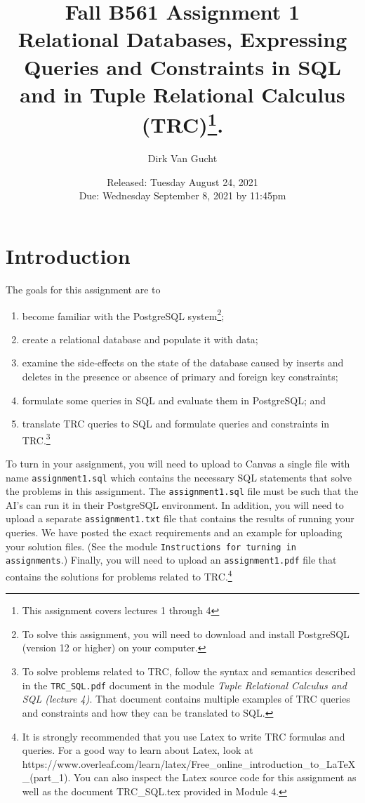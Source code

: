 \documentclass{article}
\begin{document}
\title{Fall B561 Assignment 1 \\
Relational Databases, Expressing Queries and Constraints in SQL and in Tuple Relational Calculus (TRC)\footnote{This assignment covers lectures 1 through 4}.}
\author{Dirk Van Gucht}
\date{Released: Tuesday August 24, 2021\\ Due: Wednesday September 8, 2021 by 11:45pm}
\maketitle


\section{Introduction}

The goals for this assignment are to 
\begin{enumerate}
\item become familiar with the PostgreSQL system\footnote{To solve this assignment, you will need to download and install PostgreSQL (version 12 or higher) on your computer.};
\item create a relational database and populate it with data;
\item examine the side-effects on the state of the database caused by inserts and deletes in the presence or absence
of primary and foreign key constraints;
\item formulate some queries in SQL and evaluate them in PostgreSQL; and
\item translate TRC queries to SQL and 
formulate queries and constraints in TRC.\footnote{To solve problems related to TRC, follow the syntax and semantics described in the {\tt TRC\_SQL.pdf} document
in the module \emph{Tuple Relational Calculus and SQL (lecture 4)}.   That document contains multiple examples of
TRC queries and constraints and how they can be translated to SQL.}
\end{enumerate}

To turn in your assignment, you will need to upload to Canvas a single file with name {\tt assignment1.sql} which contains 
the necessary SQL statements that solve the problems in this assignment.   
The {\tt assignment1.sql} file must be such that the AI's can run it in their PostgreSQL environment.  
In addition, you will need to upload a separate {\tt assignment1.txt} file that contains the results of running
your queries.
We have posted the exact requirements and an example for uploading your solution files.  (See the module
{\tt Instructions for turning in assignments}.)
Finally, you will need to upload an {\tt assignment1.pdf} file that contains the solutions for problems related to TRC.\footnote{It is strongly recommended that you use Latex to write TRC formulas and queries.
For a good way to learn about Latex, look at 
https://www.overleaf.com/learn/latex/Free\_online\_introduction\_to\_LaTeX\_(part\_1).
You can also inspect the Latex source code for this assignment as well as the document TRC\_SQL.tex provided in Module 4.}
\end{document}
